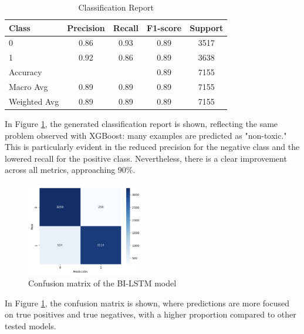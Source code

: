 \begin{table}[H]
\centering
\caption{Classification Report}
\label{tab:classification_report}
\begin{tabular}{lcccc}
\toprule
Class        & Precision & Recall & F1-score & Support \\
\midrule
0            & 0.86      & 0.93   & 0.89     & 3517    \\
1            & 0.92      & 0.86   & 0.89     & 3638    \\
\midrule
Accuracy     &           &        & 0.89     & 7155    \\
Macro Avg    & 0.89      & 0.89   & 0.89     & 7155    \\
Weighted Avg & 0.89      & 0.89   & 0.89     & 7155    \\
\bottomrule
\end{tabular}
\end{table}

In Figure \ref{fig:confusion_matrix_bilstm}, the generated classification report is shown, reflecting the same problem observed with XGBoost: many examples are predicted as "non-toxic." This is particularly evident in the reduced precision for the negative class and the lowered recall for the positive class. Nevertheless, there is a clear improvement across all metrics, approaching 90\%.

\begin{figure}[H]
    \centering
    \includegraphics[width=0.45\textwidth]{images/confusion_matrix_bilstm.png}
    \caption{Confusion matrix of the BI-LSTM model}
    \label{fig:confusion_matrix_bilstm}
\end{figure}

In Figure \ref{fig:confusion_matrix_bilstm}, the confusion matrix is shown, where predictions are more focused on true positives and true negatives, with a higher proportion compared to other tested models.